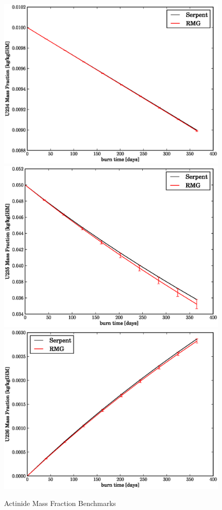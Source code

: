\begin{figure}[htbp]
\caption{Actinide Mass Fraction Benchmarks}
\label{act_benchmark}
\begin{center}
\includegraphics[scale=0.3]{multigroup_method/figs/benchmark/U234_Mass_Fraction_.eps}
\includegraphics[scale=0.3]{multigroup_method/figs/benchmark/U235_Mass_Fraction_.eps}
\includegraphics[scale=0.3]{multigroup_method/figs/benchmark/U236_Mass_Fraction_.eps}

\end{center}
\end{figure}
